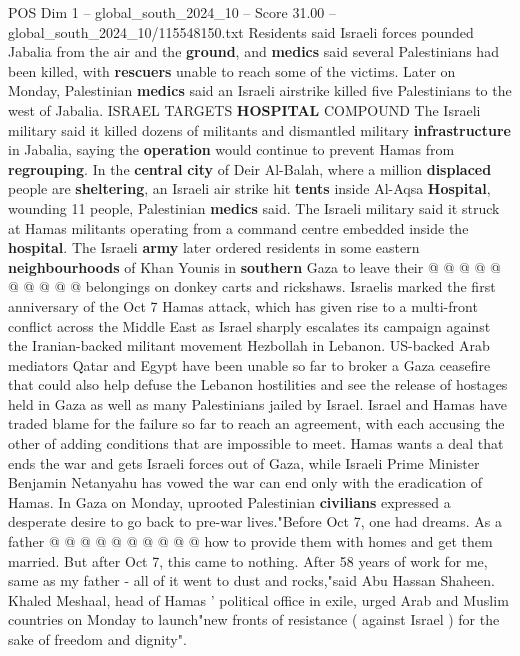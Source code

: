 \begin{textsample}{POS Dim 1 – global\_south\_2024\_10 – Score 31.00 – global\_south\_2024\_10/115548150.txt}
Residents said Israeli forces pounded Jabalia from the air and the \textbf{ground}, and \textbf{medics} said several Palestinians had been killed, with \textbf{rescuers} unable to reach some of the victims.
Later on Monday, Palestinian \textbf{medics} said an Israeli airstrike killed five Palestinians to the west of Jabalia.
ISRAEL TARGETS \textbf{HOSPITAL} COMPOUND The Israeli military said it killed dozens of militants and dismantled military \textbf{infrastructure} in Jabalia, saying the \textbf{operation} would continue to prevent Hamas from \textbf{regrouping}.
In the \textbf{central} \textbf{city} of Deir Al-Balah, where a million \textbf{displaced} people are \textbf{sheltering}, an Israeli air strike hit \textbf{tents} inside Al-Aqsa \textbf{Hospital}, wounding 11 people, Palestinian \textbf{medics} said.
The Israeli military said it struck at Hamas militants operating from a command centre embedded inside the \textbf{hospital}.
The Israeli \textbf{army} later ordered residents in some eastern \textbf{neighbourhoods} of Khan Younis in \textbf{southern} Gaza to leave their @ @ @ @ @ @ @ @ @ @ belongings on donkey carts and rickshaws.
Israelis marked the first anniversary of the Oct 7 Hamas attack, which has given rise to a multi-front conflict across the Middle East as Israel sharply escalates its campaign against the Iranian-backed militant movement Hezbollah in Lebanon.
US-backed Arab mediators Qatar and Egypt have been unable so far to broker a Gaza ceasefire that could also help defuse the Lebanon hostilities and see the release of hostages held in Gaza as well as many Palestinians jailed by Israel.
Israel and Hamas have traded blame for the failure so far to reach an agreement, with each accusing the other of adding conditions that are impossible to meet.
Hamas wants a deal that ends the war and gets Israeli forces out of Gaza, while Israeli Prime Minister Benjamin Netanyahu has vowed the war can end only with the eradication of Hamas.
In Gaza on Monday, uprooted Palestinian \textbf{civilians} expressed a desperate desire to go back to pre-war lives."Before Oct 7, one had dreams.
As a father @ @ @ @ @ @ @ @ @ @ how to provide them with homes and get them married.
But after Oct 7, this came to nothing.
After 58 years of work for me, same as my father - all of it went to dust and rocks,"said Abu Hassan Shaheen.
Khaled Meshaal, head of Hamas ' political office in exile, urged Arab and Muslim countries on Monday to launch"new fronts of resistance ( against Israel ) for the sake of freedom and dignity".

\end{textsample}
